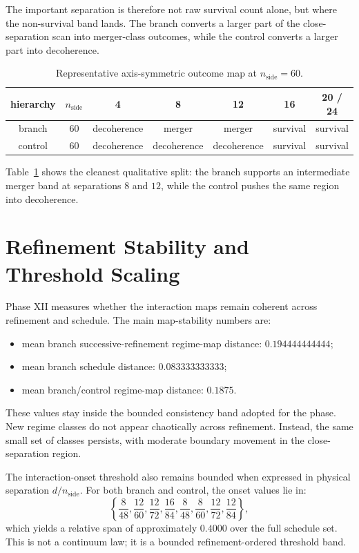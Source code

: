 \documentclass[11pt]{article}
\begin{document}
The important separation is therefore not raw survival count alone, but where the non-survival band lands. The branch converts a larger part of the close-separation scan into merger-class outcomes, while the control converts a larger part into decoherence.

\begin{table}[t]
\centering
\small
\begin{tabular}{@{}ccccccc@{}}
\toprule
hierarchy & $n_{\mathrm{side}}$ & 4 & 8 & 12 & 16 & 20 / 24 \\
\midrule
branch & 60 & decoherence & merger & merger & survival & survival \\
control & 60 & decoherence & decoherence & decoherence & survival & survival \\
\bottomrule
\end{tabular}
\caption{Representative axis-symmetric outcome map at $n_{\mathrm{side}}=60$.}
\label{tab:outcome_map}
\end{table}

Table~\ref{tab:outcome_map} shows the cleanest qualitative split: the branch supports an intermediate merger band at separations $8$ and $12$, while the control pushes the same region into decoherence.

\section{Refinement Stability and Threshold Scaling}

Phase XII measures whether the interaction maps remain coherent across refinement and schedule. The main map-stability numbers are:
\begin{itemize}
\item mean branch successive-refinement regime-map distance: $0.194444444444$;
\item mean branch schedule distance: $0.083333333333$;
\item mean branch/control regime-map distance: $0.1875$.
\end{itemize}

These values stay inside the bounded consistency band adopted for the phase. New regime classes do not appear chaotically across refinement. Instead, the same small set of classes persists, with moderate boundary movement in the close-separation region.

The interaction-onset threshold also remains bounded when expressed in physical separation $d/n_{\mathrm{side}}$. For both branch and control, the onset values lie in:
\[
\left\{
\frac{8}{48},\frac{12}{60},\frac{12}{72},\frac{16}{84},
\frac{8}{48},\frac{8}{60},\frac{12}{72},\frac{12}{84}
\right\},
\]
which yields a relative span of approximately $0.4000$ over the full schedule set. This is not a continuum law; it is a bounded refinement-ordered threshold band.
\end{document}
